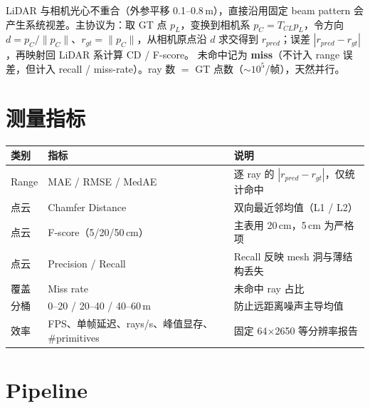 \documentclass[10pt,a4paper]{article}
\begin{document}
LiDAR 与相机光心不重合（外参平移 0.1--0.8\,m），直接沿用固定 beam pattern 会产生系统视差。主协议为：取 GT 点 $p_L$，变换到相机系 $p_C=T_{CL}p_L$，令方向 $d=p_C/\|p_C\|$、$r_{gt}=\|p_C\|$，从相机原点沿 $d$ 求交得到 $r_{pred}$；误差 $|r_{pred}-r_{gt}|$，再映射回 LiDAR 系计算 CD / F-score。
未命中记为 \textbf{miss}（不计入 range 误差，但计入 recall / miss-rate）。ray 数 $=$ GT 点数（$\sim10^5$/帧），天然并行。

\section{测量指标}

\begin{tabularx}{\textwidth}{@{}p{1.8cm}p{4.7cm}Y@{}}
\toprule
\textbf{类别} & \textbf{指标} & \textbf{说明}\\
\midrule
Range & MAE / RMSE / MedAE & 逐 ray 的 $|r_{pred}-r_{gt}|$，仅统计命中\\
点云 & Chamfer Distance & 双向最近邻均值（L1 / L2）\\
点云 & F-score（5/20/50\,cm） & 主表用 20\,cm，5\,cm 为严格项\\
点云 & Precision / Recall & Recall 反映 mesh 洞与薄结构丢失\\
覆盖 & Miss rate & 未命中 ray 占比\\
分桶 & 0--20 / 20--40 / 40--60\,m & 防止远距离噪声主导均值\\
效率 & FPS、单帧延迟、rays/s、峰值显存、\#primitives & 固定 64$\times$2650 等分辨率报告\\
\bottomrule
\end{tabularx}

\section{Pipeline}
\end{document}
